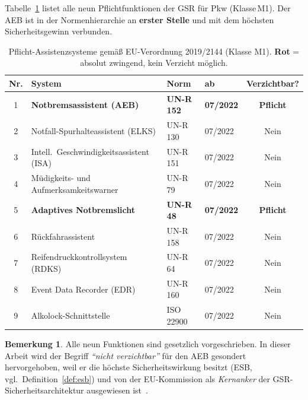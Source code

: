 ﻿\documentclass[a4paper,12pt]{article}
\theoremstyle{definition}
\newtheorem{bemerkung}{Bemerkung}
\begin{document}
Tabelle~\ref{tab:gsr_pflicht} listet alle neun Pflichtfunktionen der GSR
f\"ur Pkw (Klasse\,M1). Der AEB ist in der Normenhierarchie an
\textbf{erster Stelle} und mit dem h\"ochsten Sicherheitsgewinn verbunden.

\begin{table}[H]
\centering
\caption{Pflicht-Assistenzsysteme gem\"a\ss{} EU-Verordnung 2019/2144 (Klasse M1).
\textcolor{accentred}{\textbf{Rot}} = absolut zwingend, kein Verzicht m\"oglich.}
\label{tab:gsr_pflicht}
\renewcommand{\arraystretch}{1.40}
\begin{tabular}{@{}clllc@{}}
\toprule
\textbf{Nr.} & \textbf{System} & \textbf{Norm} & \textbf{ab} & \textbf{Verzichtbar?}\\
\midrule
\rowcolor{lightred}
1 & \textbf{Notbremsassistent (AEB)} & \textbf{UN-R 152} & \textbf{07/2022}
  & \textcolor{accentred}{\textbf{Pflicht}} \\
2 & Notfall-Spurhalteassistent (ELKS)  & UN-R 130        & 07/2022 & Nein \\
3 & Intell.\ Geschwindigkeitsassistent (ISA) & UN-R 151  & 07/2022 & Nein \\
4 & M\"udigkeits- und Aufmerksamkeitswarner  & UN-R 79   & 07/2022 & Nein \\
\rowcolor{lightred}
5 & \textbf{Adaptives Notbremslicht}   & \textbf{UN-R 48}& \textbf{07/2022}
  & \textcolor{accentred}{\textbf{Pflicht}} \\
6 & R\"uckfahrassistent                & UN-R 158        & 07/2022 & Nein \\
7 & Reifendruckkontrollsystem (RDKS)   & UN-R 64         & 07/2022 & Nein \\
8 & Event Data Recorder (EDR)          & UN-R 160        & 07/2022 & Nein \\
9 & Alkolock-Schnittstelle             & ISO 22900       & 07/2022 & Nein \\
\bottomrule
\end{tabular}
\end{table}

\begin{bemerkung}
Alle neun Funktionen sind gesetzlich vorgeschrieben. In dieser Arbeit wird
der Begriff \emph{``nicht verzichtbar''} f\"ur den AEB gesondert hervorgehoben,
weil er die h\"ochste Sicherheitswirkung besitzt (ESB, vgl.\
Definition~\ref{def:esb}) und von der EU-Kommission als
\emph{Kernanker} der GSR-Sicherheitsarchitektur ausgewiesen ist~\cite{eu2019gsr}.
\end{bemerkung}
\end{document}
